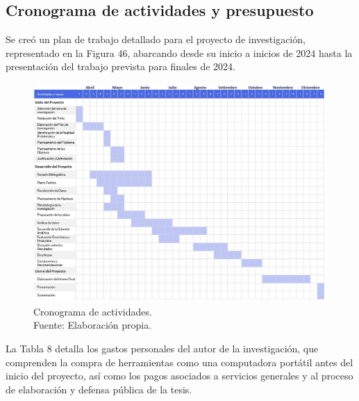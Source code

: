 \begin{landscape}
	\section{Cronograma de actividades y presupuesto}
	Se creó un plan de trabajo detallado para el proyecto de investigación, representado en la Figura 46, abarcando desde su inicio a inicios de 2024 hasta la presentación del trabajo prevista para finales de 2024.

	\begin{figure}[!ht]
		\begin{center}
			\includegraphics[width=1.35\textwidth]{3/figures/gantt.jpg}
			\caption[Cronograma de actividades]{Cronograma de actividades.\\
				Fuente: Elaboración propia.}
			\label{3:fig1}
		\end{center}
	\end{figure}
	
\end{landscape}

La Tabla 8 detalla los gastos personales del autor de la investigación, que comprenden la compra de herramientas como una computadora portátil antes del inicio del proyecto, así como los pagos asociados a servicios generales y al proceso de elaboración y defensa pública de la tesis.

